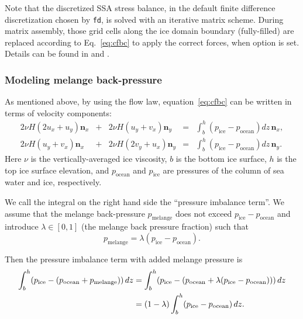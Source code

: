 Note that the discretized SSA stress balance, in the default finite difference discretization chosen by  \texttt{fd}, is solved with an iterative matrix scheme. During matrix assembly, those grid cells along the ice domain boundary (fully-filled) are replaced according to Eq.~\eqref{eq:cfbc} to apply the correct forces, when option  is set.  Details can be found in \cite{Winkelmannetal2011} and \cite{Albrechtetal2011}.  

\subsubsection{Modeling melange back-pressure}
\label{sec:model-melange-pressure}

As mentioned above, by using the flow law, equation~\eqref{eq:cfbc} can be written in terms of velocity components:
\newcommand{\psw}{p_{\text{ocean}}}
\newcommand{\pice}{p_{\text{ice}}}
\newcommand{\pmelange}{p_{\text{melange}}}
\newcommand{\n}{\mathbf{n}}
\newcommand{\nx}{\n_{x}}
\newcommand{\ny}{\n_{y}}
\begin{equation}
  \label{eq:cfbc-uv}
  \begin{array}{lclcl}
    2 \nu H (2u_x + u_y) \nx &+& 2 \nu H (u_y + v_x)  \ny &=& \displaystyle \int_{b}^{h}(\pice - \psw) dz\, \nx,\\
    2 \nu H (u_y + v_x)  \nx &+& 2 \nu H (2v_y + u_x) \ny &=& \displaystyle \int_{b}^{h}(\pice - \psw) dz\, \ny.
  \end{array}
\end{equation}
Here $\nu$ is the vertically-averaged ice viscosity, $b$ is the bottom ice surface, $h$ is the top ice surface elevation, and $\psw$ and $\pice$ are pressures of the column of sea water and ice, respectively.

We call the integral on the right hand side the ``pressure imbalance term''. We assume that the melange back-pressure $\pmelange$ does not exceed $\pice - \psw$ and introduce $\lambda \in [0,1]$ (the melange back pressure fraction) such that
\begin{equation*}
  \pmelange = \lambda (\pice - \psw).
\end{equation*}

Then the pressure imbalance term with added melange pressure is
\begin{align}
\int_{b}^{h}(\pice - (\psw + \pmelange))\, dz &= \int_{b}^{h}(\pice - (\psw + \lambda(\pice - \psw)))\, dz \notag \\
&= (1 - \lambda) \int_{b}^{h} (\pice - \psw)\, dz.  \label{eq:cfbc-3}
\end{align}

